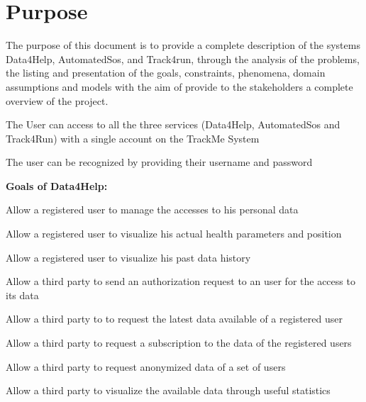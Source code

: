 \section{Purpose}
The purpose of this document is to provide a complete description of the systems Data4Help, AutomatedSos, and Track4run, through the analysis of the problems, the listing and presentation of the goals, constraints, phenomena, domain assumptions and models with the aim of provide to the stakeholders a complete overview of the project.

\begin{goalList}
\begin{enumerate}[label={[}G\arabic*{]}]

    \item \label{goal:trackme1} The User can access to all the three services (Data4Help, AutomatedSos and Track4Run) with a single account on the TrackMe System
    \item \label{goal:trackme2}The user can be recognized by providing their username and password
    
\end{enumerate}

\textbf{Goals of Data4Help:}
\begin{enumerate}[label={[}G3.\arabic*{]}]

    \item \label{goal:user1}Allow a registered user to manage the accesses to his personal data
    \item \label{goal:user2}Allow a registered user to visualize his actual health     parameters and position
    \item \label{goal:user3}Allow a registered user to visualize his past data history

    \item \label{goal:parties1}Allow a third party to send an authorization request to an     user for the access to its data
    \item \label{goal:parties2}Allow a third party to to request the latest data available     of a registered user

    \item \label{goal:parties3}Allow a third party to request a subscription to the data of the registered users

    \item \label{goal:parties4}Allow a third party to request anonymized data of a set of users

    \item \label{goal:parties5}Allow a third party to visualize the available data through useful statistics
    \newline
    

\end{enumerate}
\end{goalList}
